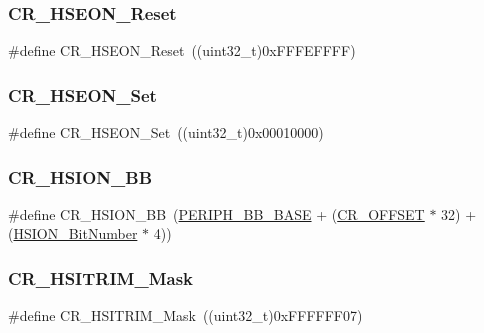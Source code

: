 \subsubsection{\texorpdfstring{CR\_HSEON\_Reset}{CR\_HSEON\_Reset}}
{\footnotesize\ttfamily \#define C\+R\+\_\+\+H\+S\+E\+O\+N\+\_\+\+Reset~((uint32\+\_\+t)0x\+F\+F\+F\+E\+F\+F\+F\+F)}

\mbox{\label{group___r_c_c___private___defines_gaca6ef9e2f11b921355809a5eccfec864}} 
\subsubsection{\texorpdfstring{CR\_HSEON\_Set}{CR\_HSEON\_Set}}
{\footnotesize\ttfamily \#define C\+R\+\_\+\+H\+S\+E\+O\+N\+\_\+\+Set~((uint32\+\_\+t)0x00010000)}

\mbox{\label{group___r_c_c___private___defines_gac3290a833c0e35ec17d32c2d494e6133}} 
\subsubsection{\texorpdfstring{CR\_HSION\_BB}{CR\_HSION\_BB}}
{\footnotesize\ttfamily \#define C\+R\+\_\+\+H\+S\+I\+O\+N\+\_\+\+BB~(\mbox{\hyperlink{group___peripheral__memory__map_gaed7efc100877000845c236ccdc9e144a}{P\+E\+R\+I\+P\+H\+\_\+\+B\+B\+\_\+\+B\+A\+SE}} + (\mbox{\hyperlink{group___r_c_c___private___defines_gafa1d3d0ea72132df651c76fc1bdffffc}{C\+R\+\_\+\+O\+F\+F\+S\+ET}} $\ast$ 32) + (\mbox{\hyperlink{group___r_c_c___private___defines_ga3d3085e491cbef815d223afbe5bf1930}{H\+S\+I\+O\+N\+\_\+\+Bit\+Number}} $\ast$ 4))}

\mbox{\label{group___r_c_c___private___defines_gac6a6adccdfb5a34541e2cdf01daf98ce}} 
\subsubsection{\texorpdfstring{CR\_HSITRIM\_Mask}{CR\_HSITRIM\_Mask}}
{\footnotesize\ttfamily \#define C\+R\+\_\+\+H\+S\+I\+T\+R\+I\+M\+\_\+\+Mask~((uint32\+\_\+t)0x\+F\+F\+F\+F\+F\+F07)}

